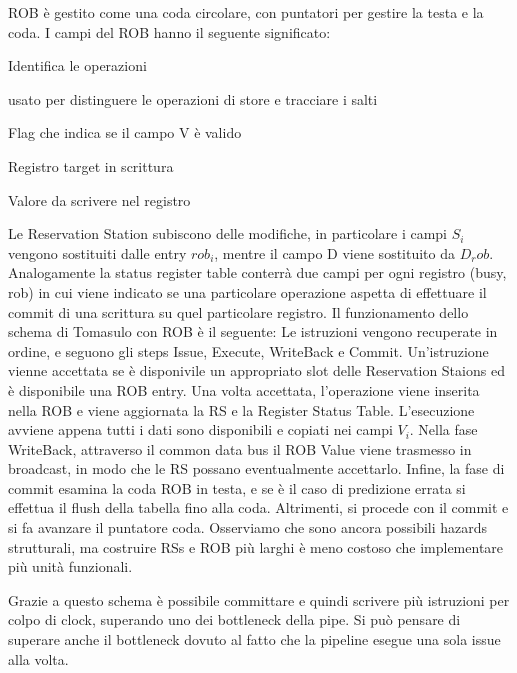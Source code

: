 \noindent ROB è gestito come una coda circolare, con puntatori per gestire la testa e la coda. I campi del ROB hanno il seguente significato:

\begin{description}[style=nextline,leftmargin=3.45cm,labelwidth=2.8cm,labelsep=0.4cm,font=\ttfamily\bfseries, itemsep=0.01em]
\item[rob \#] Identifica le operazioni 
\item[type] usato per distinguere le operazioni di store e tracciare i salti 
\item[state] Flag che indica se il campo V è valido 
\item[D] Registro target in scrittura 
\item[V] Valore da scrivere nel registro   
\end{description}

\noindent Le Reservation Station subiscono delle modifiche, in particolare i campi $S_i$ vengono sostituiti dalle entry $rob_i$, mentre il campo D viene sostituito da $D_rob$. Analogamente la status register table conterrà due campi per ogni registro (busy, rob) in cui viene indicato se una particolare operazione aspetta di effettuare il commit di una scrittura su quel particolare registro.  
Il funzionamento dello schema di Tomasulo con ROB è il seguente: Le istruzioni vengono recuperate in ordine, e seguono gli steps Issue, Execute, WriteBack e Commit. Un'istruzione vienne accettata se è disponivile un appropriato slot delle Reservation Staions ed è disponibile una ROB entry. Una volta accettata, l'operazione viene inserita nella ROB e viene aggiornata la RS e la Register Status Table. L'esecuzione avviene appena tutti i dati sono disponibili e copiati nei campi $V_i$. Nella fase WriteBack, attraverso il common data bus il ROB Value viene trasmesso in broadcast, in modo che le RS possano eventualmente accettarlo. Infine, la fase di commit esamina la coda ROB in testa, e se è il caso di predizione errata si effettua il flush della tabella fino alla coda. Altrimenti, si procede con il commit e si fa avanzare il puntatore coda. Osserviamo che sono ancora possibili hazards strutturali, ma costruire RSs e ROB più larghi è meno costoso che implementare più unità funzionali. 

\begin{figure}[ht]
    \centering
    \setlength{\fboxrule}{0.5pt} %
    \setlength{\fboxsep}{0pt}    %
\end{figure}

\noindent Grazie a questo schema è possibile committare e quindi scrivere più istruzioni per colpo di clock, superando uno dei bottleneck della pipe. Si può pensare di superare anche il bottleneck dovuto al fatto che la pipeline esegue una sola issue alla volta.
